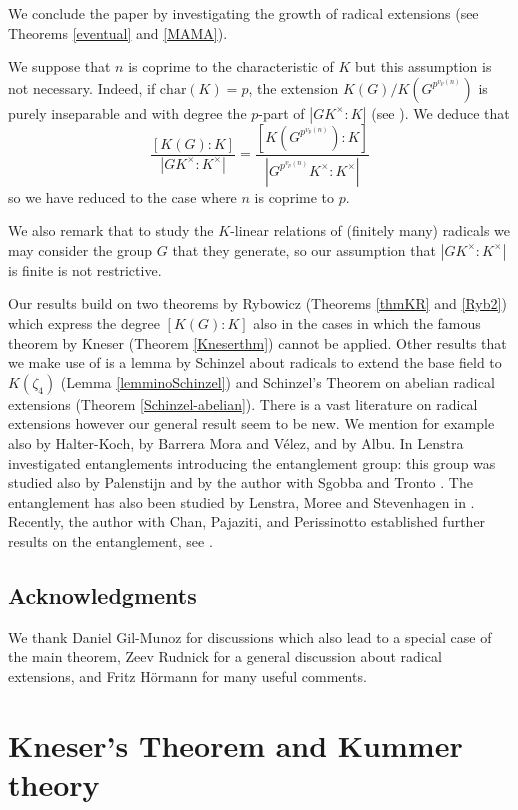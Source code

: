 \documentclass[11pt, a4paper]{amsart}
\theoremstyle{definition}
\newcommand{\ch}{\mathrm{char}}
\begin{document}
We conclude the paper by investigating the growth of radical extensions (see Theorems \ref{eventual} and \ref{MAMA}). 

We suppose that $n$ is coprime to the characteristic of $K$ but this assumption is not necessary. Indeed, if $\ch(K)=p$, the extension $K(G)/K(G^{p^{v_p(n)}})$ is purely inseparable and with degree the $p$-part of $|GK^\times: K|$ (see \cite[Corollary 9.2, Chapter VI]{LangAlgebra}). We deduce that
$$\frac{[K(G):K]}{|GK^\times:K^\times|}=\frac{[K(G^{p^{v_p(n)}}):K]}{|G^{p^{v_p(n)}}K^\times:K^\times|}$$
so we have reduced to the case where $n$ is coprime to $p$.

We also remark that to study the $K$-linear relations of (finitely many) radicals we may consider the group $G$ that they generate, so our assumption that $|GK^\times:K^\times|$ is finite is not restrictive.

Our results build on two theorems by Rybowicz (Theorems \ref{thmKR} and \ref{Ryb2}) which express the degree $[K(G):K]$ also in the cases in which the famous theorem by Kneser (Theorem \ref{Kneserthm}) cannot be applied. Other results that we make use of is a lemma by Schinzel about radicals to extend the base field to $K(\zeta_4)$ (Lemma \ref{lemminoSchinzel}) and Schinzel's Theorem on abelian radical extensions (Theorem \ref{Schinzel-abelian}).
There is a vast literature on radical extensions however our general result seem to be new. We mention for example also \cite{Koch2} by 
Halter-Koch, \cite{BarreraVelez} by Barrera Mora and Vélez, and  \cite{Albu} by Albu. In \cite{Lenstra} Lenstra investigated entanglements introducing the entanglement group: this group was studied also by Palenstijn \cite{Palenstijn} and by the author with Sgobba and Tronto \cite{MAMA}. The entanglement has also been studied by Lenstra, Moree and Stevenhagen in \cite{LMS}. Recently, the author with Chan, Pajaziti, and Perissinotto established further results on the entanglement, see \cite{EntRad}.

\subsection*{Acknowledgments} We thank Daniel Gil-Munoz for discussions which also lead to a special case of the main theorem, Zeev Rudnick for a general discussion about radical extensions, and Fritz Hörmann for many useful comments.

\section{Kneser's Theorem and Kummer theory}\label{sec:KneserKummer}
\end{document}
